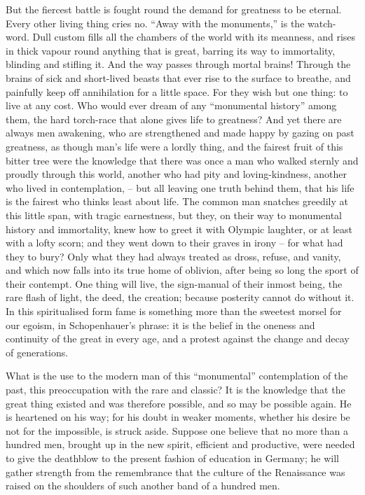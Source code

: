 But the fiercest battle is fought round the demand for greatness to
be eternal. Every other living thing cries no. \enquote{Away with the
monuments,} is the watch-word. Dull custom fills all the chambers of
the world with its meanness, and rises in thick vapour round anything
that is great, barring its way to immortality, blinding and stifling
it. And the way passes through mortal brains! Through the brains of
sick and short-lived beasts that ever rise to the surface to breathe,
and painfully keep off annihilation for a little space. For they wish
but one thing: to live at any cost. Who would ever dream of any
\enquote{monumental history} among them, the hard torch-race that alone gives
life to greatness? And yet there are always men awakening, who are
strengthened and made happy by gazing on past greatness, as though
man's life were a lordly thing, and the fairest fruit of this bitter
tree were the knowledge that there was once a man who walked sternly
and proudly through this world, another who had pity and
loving-kindness, another who lived in contemplation, -- but all leaving
one truth behind them, that his life is the fairest who thinks least
about life. The common man snatches greedily at this little span,
with tragic earnestness, but they, on their way to monumental history
and immortality, knew how to greet it with Olympic laughter, or at
least with a lofty scorn; and they went down to their graves in
irony -- for what had they to bury? Only what they had always treated
as dross, refuse, and vanity, and which now falls into its true home
of oblivion, after being so long the sport of their contempt. One
thing will live, the sign-manual of their inmost being, the rare
flash of light, the deed, the creation; because posterity cannot do
without it. In this spiritualised form fame is something more than
the sweetest morsel for our egoism, in Schopenhauer's phrase: it is
the belief in the oneness and continuity of the great in every age,
and a protest against the change and decay of generations.

What is the use to the modern man of this \enquote{monumental} contemplation
of the past, this preoccupation with the rare and classic? It is the
knowledge that the great thing existed and was therefore possible,
and so may be possible again. He is heartened on his way; for his
doubt in weaker moments, whether his desire be not for the
impossible, is struck aside. Suppose one believe that no more than a
hundred men, brought up in the new spirit, efficient and productive,
were needed to give the deathblow to the present fashion of education
in Germany; he will gather strength from the remembrance that the
culture of the Renaissance was raised on the shoulders of such
another band of a hundred men.

